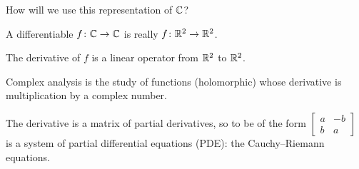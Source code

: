 \documentclass[10pt,aspectratio=169]{beamer}
\begin{document}
\begin{frame}

How will we use this representation of ${\mathbb{C}}$?

\medskip
\pause

A differentiable
$f \colon {\mathbb{C}} \to {\mathbb{C}}$ is really
$f \colon {\mathbb{R}}^2 \to {\mathbb{R}}^2$.

\medskip
\pause

The derivative of $f$ is a linear operator from ${\mathbb{R}}^2$ to ${\mathbb{R}}^2$.

\medskip
\pause

Complex analysis is the study of functions (holomorphic) whose
derivative is multiplication by a complex number.

\medskip
\pause

The derivative is a matrix of partial derivatives, so to be of the form
$\left[
\begin{smallmatrix}
a & -b \\
b & a
\end{smallmatrix}
\right]$ is a system of partial differential equations (PDE):
the Cauchy--Riemann equations.
\end{frame}
\end{document}
